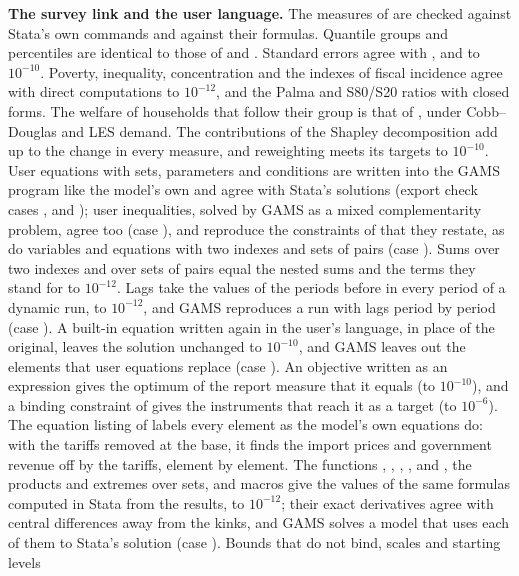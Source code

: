 \textbf{The survey link and the user language.} The measures of
 are checked against Stata's own commands and against
their formulas. Quantile groups and percentiles are identical to those of
 and . Standard errors agree with ,
 and  to $10^{-10}$. Poverty, inequality,
concentration and the indexes of fiscal incidence agree with direct
computations to $10^{-12}$, and the Palma and S80/S20 ratios with closed
forms. The welfare of households that follow their group is that of
, under Cobb--Douglas and LES demand. The contributions of
the Shapley decomposition add up to the change in every measure, and
reweighting meets its targets to $10^{-10}$. User equations with sets,
parameters and conditions are written into the GAMS program like the model's
own and agree with Stata's solutions (export check cases ,
 and ); user inequalities, solved by GAMS as a
mixed complementarity problem, agree too (case ), and
reproduce the constraints of  that they restate, as do
variables and equations with two indexes and sets of pairs (case
). Sums over two indexes and over sets of pairs equal the nested
sums and the terms they stand for to $10^{-12}$. Lags take the values of the
periods before in every period of a dynamic run, to $10^{-12}$, and GAMS
reproduces a run with lags period by period (case ). A built-in
equation written again in the user's language, in place of the original, leaves
the solution unchanged to $10^{-10}$, and GAMS leaves out the elements that user
equations replace (case ). An objective written as an
expression gives the optimum of the report measure that it equals (to
$10^{-10}$), and a binding constraint of  gives the
instruments that reach it as a target (to $10^{-6}$). The equation listing of
 labels every element as the model's own equations do: with
the tariffs removed at the base, it finds the import prices and government
revenue off by the tariffs, element by element. The functions
, , , ,  and
, the products and extremes over sets,  and macros
give the values of the same formulas computed in Stata from the results, to
$10^{-12}$; their exact derivatives agree with central differences away from
the kinks, and GAMS solves a model that uses each of them to Stata's solution
(case ). Bounds that do not bind, scales and starting levels
